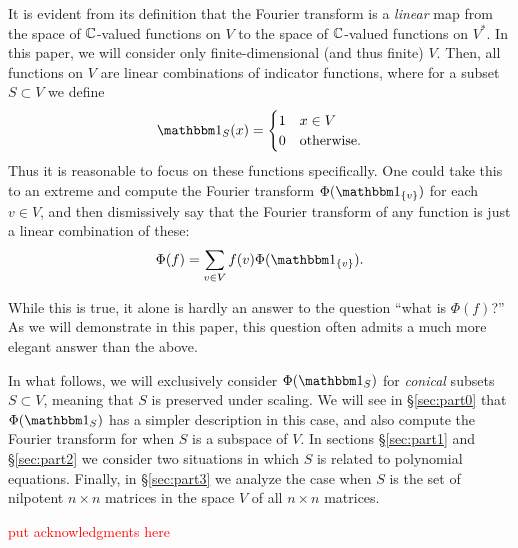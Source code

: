 It is evident from its definition that the Fourier transform is a \emph{linear} map from the space of $\mathbb{C}$-valued functions on $V$ to the space of $\mathbb{C}$-valued functions on $V^*$. In this paper, we will consider only finite-dimensional (and thus finite) $V$. Then, all functions on $V$ are linear combinations of indicator functions, where for a subset $S\subset V$ we define
\[ \IND_S(x) = \begin{cases}
1 & x \in V \\
0 & \text{otherwise.}     
\end{cases} \]
Thus it is reasonable to focus on these functions specifically. One could take this to an extreme and compute the Fourier transform $\Phi(\IND_{\{v\}})$ for each $v\in V$, and then dismissively say that the Fourier transform of any function is just a linear combination of these:
\[
	\Phi(f) = \sum_{v\in V} f(v)\Phi(\IND_{\{v\}}).
\]

While this is true, it alone is hardly an answer to the question ``what is $\Phi(f)$?'' As we will demonstrate in this paper, this question often admits a much more elegant answer than the above.

In what follows, we will exclusively consider $\Phi(\IND_S)$ for \emph{conical} subsets $S\subset V$, meaning that $S$ is preserved under scaling. We will see in \S\ref{sec:part0} that $\Phi(\IND_S)$ has a simpler description in this case, and also compute the Fourier transform for when $S$ is a subspace of $V$. In sections \S\ref{sec:part1} and \S\ref{sec:part2} we consider two situations in which $S$ is related to polynomial equations. Finally, in \S\ref{sec:part3} we analyze the case when $S$ is the set of nilpotent $n\times n$ matrices in the space $V$ of all $n\times n$ matrices.

\textcolor{red}{put acknowledgments here}
